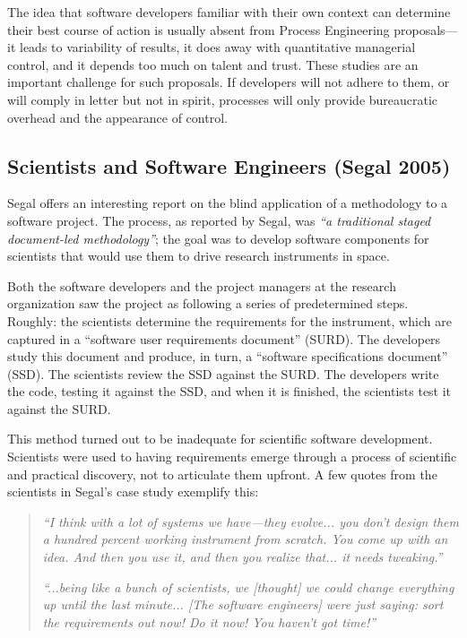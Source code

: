 The idea that software developers familiar with their own context can determine their best course of action is usually absent from Process Engineering proposals---it leads to variability of results, it does away with quantitative managerial control, and it depends too much on talent and trust. These studies are an important challenge for such proposals. If developers will not adhere to them, or will comply in letter but not in spirit, processes will only provide bureaucratic overhead and the appearance of control.



\subsection{Scientists and Software Engineers (Segal 2005)}
\label{sec:Segal}

Segal  offers an interesting report on the blind application of a methodology to a software project. The process, as reported by Segal, was \emph{``a traditional staged document-led methodology''}; the goal was to develop software components for scientists that would use them to drive research instruments in space.

Both the software developers and the project managers at the research organization saw the project as following a series of predetermined steps. Roughly: the scientists determine the requirements for the instrument, which are captured in a ``software user requirements document'' (SURD). The developers study this document and produce, in turn, a ``software specifications document'' (SSD). The scientists review the SSD against the SURD. The developers write the code, testing it against the SSD, and when it is finished, the scientists test it against the SURD.

This method turned out to be inadequate for scientific software development. Scientists were used to having requirements emerge through a process of scientific and practical discovery, not to articulate them upfront. A few quotes from the scientists in Segal's case study exemplify this:

\begin{quote}
\emph{``I think with a lot of systems we have---they evolve... you don't design them a hundred percent working instrument from scratch. You come up with an idea. And then you use it, and then you realize that... it needs tweaking.''}

\emph{``...being like a bunch of scientists, we [thought] we could change everything up until the last minute... [The software engineers] were just saying: sort the requirements out now! Do it now! You haven't got time!''}
\end{quote}

